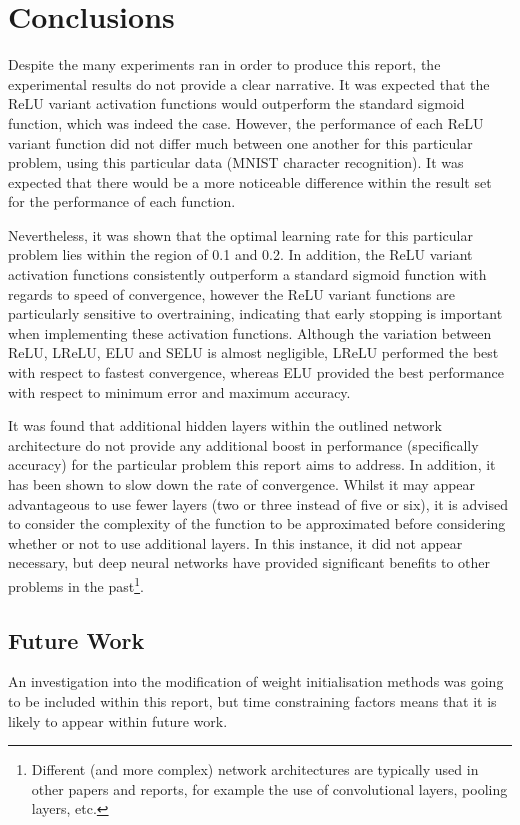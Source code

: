 \documentclass{article}
\begin{document}
\section{Conclusions}
\label{sec:concl}

Despite the many experiments ran in order to produce this report, the experimental results do not provide a clear narrative. It was expected that the ReLU variant activation functions would outperform the standard sigmoid function, which was indeed the case. However, the performance of each ReLU variant function did not differ much between one another for this particular problem, using this particular data (MNIST character recognition). It was expected that there would be a more noticeable difference within the result set for the performance of each function. 

Nevertheless, it was shown that the optimal learning rate for this particular problem lies within the region of 0.1 and 0.2. In addition, the ReLU variant activation functions consistently outperform a standard sigmoid function with regards to speed of convergence, however the ReLU variant functions are particularly sensitive to overtraining, indicating that early stopping is important when implementing these activation functions. Although the variation between ReLU, LReLU, ELU and SELU is almost negligible, LReLU performed the best with respect to fastest convergence, whereas ELU provided the best performance with respect to minimum error and maximum accuracy.

It was found that additional hidden layers within the outlined network architecture do not provide any additional boost in performance (specifically accuracy) for the particular problem this report aims to address. In addition, it has been shown to slow down the rate of convergence. Whilst it may appear advantageous to use fewer layers (two or three instead of five or six), it is advised to consider the complexity of the function to be approximated before considering whether or not to use additional layers. In this instance, it did not appear necessary, but deep neural networks have provided significant benefits to other problems in the past\citep{krizhevsky2012imagenet}\footnote{Different (and more complex) network architectures are typically used in other papers and reports, for example the use of convolutional layers, pooling layers, etc.}.

\subsection{Future Work}

An investigation into the modification of weight initialisation methods was going to be included within this report, but time constraining factors means that it is likely to appear within future work.


\end{document}
